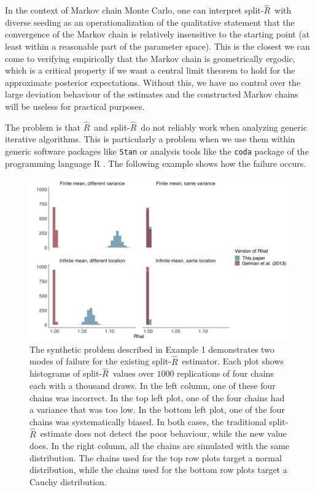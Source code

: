 \documentclass[american,]{article}
\newcommand{\Rhat}{$\widehat{R}$}
\newcommand{\sRhat}{split-$\widehat{R}$}
\theoremstyle{definition}
\begin{document}
In the context of Markov chain Monte Carlo, one can interpret \sRhat\ 
with diverse seeding as an operationalization of the qualitative statement 
that the convergence of the Markov chain is relatively insensitive to the starting 
point (at least within a 
reasonable part of the parameter space). This is the closest we can come to 
verifying empirically that the Markov chain is geometrically ergodic, which is a critical 
property if we want  a central limit theorem to hold for the approximate
posterior expectations. Without this, we have no control over the large
deviation behaviour of the estimates and the constructed Markov chains will
be useless for practical purposes.

 
The problem is that \Rhat\ and \sRhat\ do not reliably work when analyzing 
generic iterative algorithms.  This is particularly a problem when we use them 
within generic software packages like \texttt{Stan} \citep{Stan:JSS:2017} or 
analysis tools like the \texttt{coda} package \citep{coda2006} of the 
programming language R \citep{R2018}. The following example shows how the 
failure occurs.

\begin{figure}
\centering
\includegraphics[width=\textwidth]{graphics/simple_rhat_compare.png}
\caption{  The synthetic problem described in Example 1 demonstrates
two modes of failure for the existing \sRhat\ estimator. Each plot shows
histograms of \sRhat\ values over $1000$ replications of four chains each
with a thousand draws. In the left column, one of these four chains was 
incorrect. In the top left plot, one of the four chains had a variance that was too low.
In the bottom left plot, one of the four chains was systematically biased. 
In both cases, the traditional \sRhat\ estimate does not detect the poor
behaviour, while the new value does. In the right column, all the chains are
simulated with the same distribution. The chains used for the top row plots target 
a normal distribution, while the chains used for the bottom row plots target
a Cauchy distribution. \label{fig:simple_example}}
\end{figure}
\end{document}
